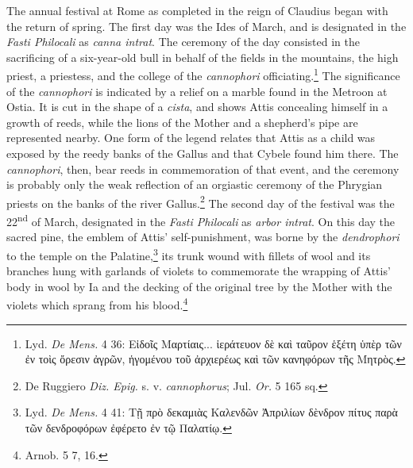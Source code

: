 \documentclass[a4paper, 11pt, oneside, polutonikogreek, french]{article}
\begin{document}
The annual festival at Rome as completed in the reign of Claudius began with the return of spring. The first day was the Ides of March, and is designated in the \emph{Fasti Philocali} as \emph{canna intrat}. The ceremony of the day consisted in the sacrificing of a six-year-old bull in behalf of the fields in the mountains, the high priest, a priestess, and the college of the \emph{cannophori} officiating.\footnote{Lyd. \emph{De Mens.} 4 36: Εἰδοῖς Μαρτίαις... ἱεράτευον δὲ καὶ ταῦρον ἑξέτη ὑπὲρ τῶν ἐν τοὶς ὄρεσιν ἀγρῶν, ἡγομένου τοῦ ἀρχιερέως καὶ τῶν κανηφόρων τῆς Μητρὸς.} The significance of the \emph{cannophori} is indicated by a relief on a marble found in the Metroon at Ostia. It is cut in the shape of a \emph{cista}, and shows Attis concealing himself in a growth of reeds, while the lions of the Mother and a shepherd's pipe are represented nearby. One form of the legend relates that Attis as a child was exposed by the reedy banks of the Gallus and that Cybele found him there. The \emph{cannophori}, then, bear reeds in commemoration of that event, and the ceremony is probably only the weak reflection of an orgiastic ceremony of the Phrygian priests on the banks of the river Gallus.\footnote{De Ruggiero \emph{Diz. Epig.} s. v. \emph{cannophorus}; Jul. \emph{Or.} 5 165 sq.} The second day of the festival was the 22\textsuperscript{nd} of March, designated in the \emph{Fasti Philocali} as \emph{arbor intrat}. On this day the sacred pine, the emblem of Attis' self-punishment, was borne by the \emph{dendrophori} to the temple on the Palatine,\footnote{Lyd. \emph{De Mens.} 4 41: Τῇ πρὸ δεκαμιὰς Καλενδῶν Ἀπριλίων δὲνδρον πίτυς παρὰ τῶν δενδροφόρων ἐφέρετο ἐν τῷ Παλατίῳ.} its trunk wound with fillets of wool and its branches hung with garlands of violets to commemorate the wrapping of Attis' body in wool by Ia and the decking of the original tree by the Mother with the violets which sprang from his blood.\footnote{Arnob. 5 7, 16.}
\end{document}
